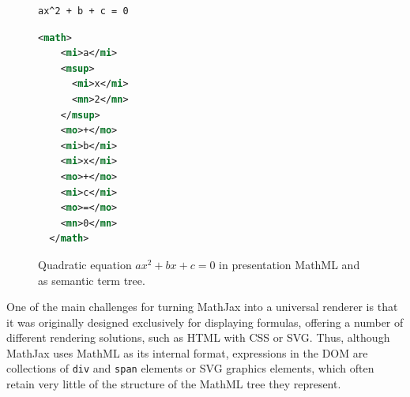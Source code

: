 \documentclass{sig-alternate}
\begin{document}
\begin{figure}[t]
  \quad
  \begin{minipage}{.35\columnwidth}
\begin{lstlisting}[language=TeX,basicstyle=\scriptsize]
  ax^2 + b + c = 0
\end{lstlisting}
\begin{lstlisting}[language=XML,basicstyle=\scriptsize]
  <math>
    <mi>a</mi>
    <msup>
      <mi>x</mi>
      <mn>2</mn>
    </msup>
    <mo>+</mo>
    <mi>b</mi>
    <mi>x</mi>
    <mo>+</mo>
    <mi>c</mi>
    <mo>=</mo>
    <mn>0</mn>
  </math>
      \end{lstlisting}
    \end{minipage}
  \qquad
\begin{minipage}{.6\columnwidth}
  \end{minipage}
  \caption{Quadratic equation $ax^2 + bx + c = 0$ in presentation
    MathML and as semantic term tree.}
  \vspace*{-.3cm}
  \label{fig:semantic-tree}
\end{figure}

One of the main challenges for turning MathJax into a universal renderer is that it
was originally designed exclusively for displaying formulas, offering
a number of different rendering solutions, such as HTML with CSS or SVG. Thus,
although MathJax uses MathML as its internal format, expressions in the DOM are
collections of \texttt{div} and \texttt{span} elements or SVG graphics elements, which often
retain very little of the structure of the MathML tree they represent.
\end{document}
